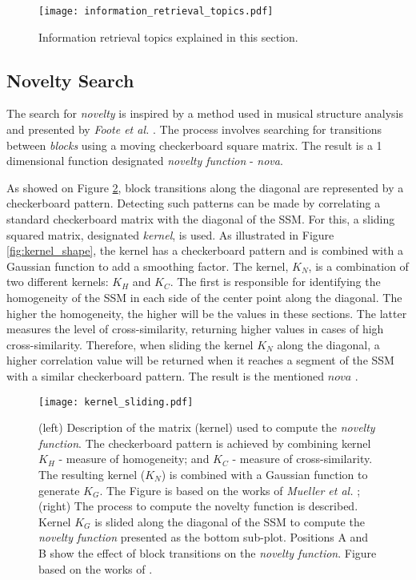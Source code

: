 \begin{figure}
\centering
\texttt{[image: information\_retrieval\_topics.pdf]}
\caption{Information retrieval topics explained in this section.}
\label{fig:info_retrieval_topics}
\end{figure}


\subsection{Novelty Search}

The search for \textit{novelty} is inspired by a method used in musical structure analysis and presented by \textit{Foote et al.} \cite{foote2000}. The process involves searching for transitions between \textit{blocks} using a moving checkerboard square matrix. The result is a 1 dimensional function designated \textit{novelty function} - \textit{nova}.
\par
As showed on Figure \ref{fig:kernel_description}, block transitions along the diagonal are represented by a checkerboard pattern. Detecting such patterns can be made by correlating a standard checkerboard matrix with the diagonal of the \gls{SSM}. For this, a sliding squared matrix, designated \textit{kernel}, is used. As illustrated in Figure \ref{fig:kernel_shape}, the kernel has a checkerboard pattern and is combined with a Gaussian function to add a smoothing factor. The kernel, $K_N$, is a combination of two different kernels: $K_H$ and $K_C$. The first is responsible for identifying the homogeneity of the \gls{SSM} in each side of the center point along the diagonal. The higher the homogeneity, the higher will be the values in these sections. The latter measures the level of cross-similarity, returning higher values in cases of high cross-similarity. Therefore, when sliding the kernel $K_N$ along the diagonal, a higher correlation value will be returned when it reaches a segment of the \gls{SSM} with a similar checkerboard pattern. The result is the mentioned $nova$ \cite{Dannenberg2008, Mueller15_FMP_SPRINGER, MuellerZ19_FMP_ISMIR}.

\begin{figure}
    \centering
    \texttt{[image: kernel\_sliding.pdf]}
    \caption{(left) Description of the matrix (kernel) used to compute the \textit{novelty function}. The checkerboard pattern is achieved by combining kernel $K_H$ - measure of homogeneity; and $K_C$ - measure of cross-similarity. The resulting kernel ($K_N$) is combined with a Gaussian function to generate $K_G$. The Figure is based on the works of \textit{Mueller et al.} \cite{Mueller15_FMP_SPRINGER, MuellerZ19_FMP_ISMIR}; (right) The process to compute the novelty function is described. Kernel $K_G$ is slided along the diagonal of the \gls{SSM} to compute the \textit{novelty function} presented as the bottom sub-plot. Positions A and B show the effect of block transitions on the \textit{novelty function}. Figure based on the works of \cite{Dannenberg2008, Mueller15_FMP_SPRINGER, MuellerZ19_FMP_ISMIR}.}
    \label{fig:kernel_description}
\end{figure}

